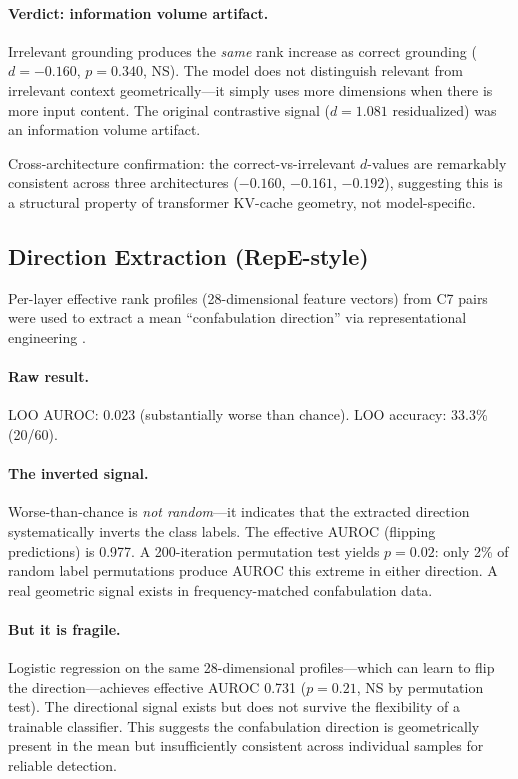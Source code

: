 \paragraph{Verdict: information volume artifact.} Irrelevant grounding produces the \emph{same} rank increase as correct grounding ($d = -0.160$, $p = 0.340$, NS). The model does not distinguish relevant from irrelevant context geometrically---it simply uses more dimensions when there is more input content. The original contrastive signal ($d = 1.081$ residualized) was an information volume artifact.

Cross-architecture confirmation: the correct-vs-irrelevant $d$-values are remarkably consistent across three architectures ($-0.160$, $-0.161$, $-0.192$), suggesting this is a structural property of transformer KV-cache geometry, not model-specific.

\subsection{Direction Extraction (RepE-style)}
\label{sec:direction}

Per-layer effective rank profiles (28-dimensional feature vectors) from C7 pairs were used to extract a mean ``confabulation direction'' via representational engineering \citep{zou2023representation}.

\paragraph{Raw result.} LOO AUROC: 0.023 (substantially worse than chance). LOO accuracy: 33.3\% (20/60).

\paragraph{The inverted signal.} Worse-than-chance is \emph{not random}---it indicates that the extracted direction systematically inverts the class labels. The effective AUROC (flipping predictions) is 0.977. A 200-iteration permutation test yields $p = 0.02$: only 2\% of random label permutations produce AUROC this extreme in either direction. A real geometric signal exists in frequency-matched confabulation data.

\paragraph{But it is fragile.} Logistic regression on the same 28-dimensional profiles---which can learn to flip the direction---achieves effective AUROC 0.731 ($p = 0.21$, NS by permutation test). The directional signal exists but does not survive the flexibility of a trainable classifier. This suggests the confabulation direction is geometrically present in the mean but insufficiently consistent across individual samples for reliable detection.

